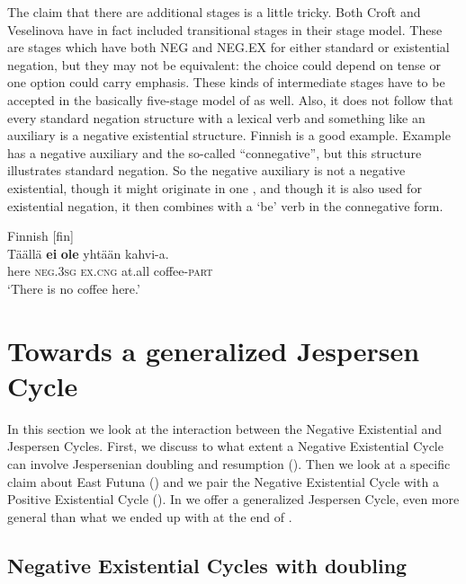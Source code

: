 ﻿\documentclass[output=paper,draft,draftmode,colorlinks,citecolor=brown]{langscibook}
\begin{document}
The claim that there are additional stages is a little tricky. Both Croft
and Veselinova have in fact included transitional stages in their stage
model. These are stages which have both NEG and NEG.EX for either standard
or existential negation, but they may not be equivalent: the choice could
depend on tense or one option could carry emphasis. These kinds of
intermediate stages have to be accepted in the basically five-stage model
of  as well. Also, it does not follow that every standard
negation structure with a lexical verb and something like an auxiliary is a
negative existential structure. Finnish is a good example. Example
 has a negative auxiliary and the so-called ``connegative'',
but this structure illustrates standard negation. So the negative auxiliary
is not a negative existential, though it might originate in one
\parencite[see][577 for references]{Veselinova2015}, and though it is also
used
for existential negation, it then combines with a `be' verb in the
connegative form.
%
\begin{exe}\ex\label{ex:int-finnish-kahvi}
          Finnish [fin] \\
    \gll Täällä  \textbf{ei}    \textbf{ole}    yhtään   kahvi-a.  \\
  here  \textsc{neg.3sg}  \textsc{ex.cng}  at.all    coffee-\textsc{part} \\
    \glt `There is no coffee here.'
    \end{exe} 

\section{Towards a generalized Jespersen Cycle}\label{sec:int-4}

In this section we look at the interaction between the Negative Existential and
Jespersen Cycles. First, we discuss to what extent a Negative Existential
Cycle can involve Jespersenian doubling and resumption
(). Then we look
at a specific claim about East Futuna () and we pair the Negative
Existential Cycle with a Positive Existential Cycle
(). In  we
offer a generalized Jespersen Cycle, even more general than what we ended
up with at the end of .

\subsection{Negative Existential Cycles with doubling}\label{sec:int-4.1}
\end{document}
